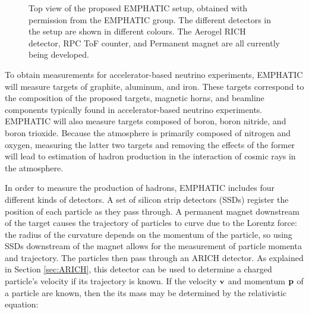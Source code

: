 \begin{figure}[] 
\centering
{}
\caption[Top view of \ac{EMPHATIC}]{Top view of the proposed \ac{EMPHATIC} setup, obtained with permission from the \ac{EMPHATIC} group. The different detectors in the setup are shown in different colours. The Aerogel RICH detector, RPC ToF counter, and Permanent magnet are all currently being developed.}

\label{fig:EMPHATIC}       %
\end{figure}

To obtain measurements for accelerator-based neutrino experiments, \ac{EMPHATIC} will measure targets of graphite, aluminum, and iron. These targets correspond to the composition of the proposed targets, magnetic horns, and beamline components typically found in accelerator-based neutrino experiments. \ac{EMPHATIC} will also measure targets composed of boron, boron nitride, and boron trioxide. Because the atmosphere is primarily composed of nitrogen and oxygen, measuring the latter two targets and removing the effects of the former will lead to estimation of hadron production in the interaction of cosmic rays in the atmosphere. 

In order to measure the production of hadrons, \ac{EMPHATIC} includes four different kinds of detectors. A set of silicon strip detectors (SSDs) register the position of each particle as they pass through. A permanent magnet downstream of the target causes the trajectory of particles to curve due to the Lorentz force: the radius of the curvature depends on the momentum of the particle, so using SSDs downstream of the magnet allows for the measurement of particle momenta and trajectory. The particles then pass through an \ac{ARICH} detector. As explained in Section \ref{sec:ARICH}, this detector can be used to determine a charged particle's velocity if its trajectory is known. If the velocity $\bf{v}$ and momentum $\bf{p}$ of a particle are known, then the its mass may be determined by the relativistic equation:


